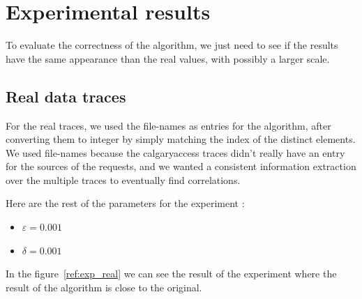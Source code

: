 \documentclass[a4paper]{article}%
\begin{document}
\section{Experimental results}
To evaluate the correctness of the algorithm, we just need to see if the results have the same appearance than the real values, with possibly a larger scale.

\subsection{Real data traces}

For the real traces, we used the file-names as entries for the algorithm, after converting them to integer by simply matching the index of the distinct elements. We used file-names because the calgaryaccess traces didn't really have an entry for the sources of the requests, and we wanted a consistent information extraction over the multiple traces to eventually find correlations.

Here are the rest of the parameters for the experiment :

\begin{itemize}
	\item $\varepsilon = 0.001$
	\item $\delta = 0.001$
\end{itemize}

In the figure~\ref{ref:exp_real} we can see the result of the experiment where the result of the algorithm is close to the original.
\end{document}
